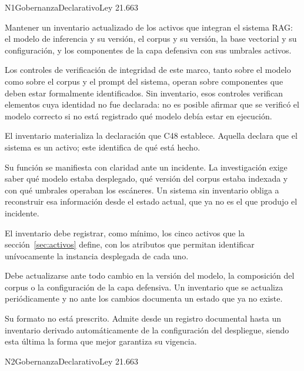   {N1}{Gobernanza}{Declarativo}{Ley 21.663}

Mantener un inventario actualizado de los activos que integran el sistema RAG: el modelo de inferencia y su versión, el corpus y su versión, la base vectorial y su configuración, y los componentes de la capa defensiva con sus umbrales activos.

Los controles de verificación de integridad de este marco, tanto sobre el modelo como sobre el corpus y el prompt del sistema, operan sobre componentes que deben estar formalmente identificados. Sin inventario, esos controles verifican elementos cuya identidad no fue declarada: no es posible afirmar que se verificó el modelo correcto si no está registrado qué modelo debía estar en ejecución.

El inventario materializa la declaración que C48 establece. Aquella declara que el sistema es un activo; este identifica de qué está hecho.

Su función se manifiesta con claridad ante un incidente. La investigación exige saber qué modelo estaba desplegado, qué versión del corpus estaba indexada y con qué umbrales operaban los escáneres. Un sistema sin inventario obliga a reconstruir esa información desde el estado actual, que ya no es el que produjo el incidente.

El inventario debe registrar, como mínimo, los cinco activos que la sección~\ref{sec:activos} define, con los atributos que permitan identificar unívocamente la instancia desplegada de cada uno.

Debe actualizarse ante todo cambio en la versión del modelo, la composición del corpus o la configuración de la capa defensiva. Un inventario que se actualiza periódicamente y no ante los cambios documenta un estado que ya no existe.

Su formato no está prescrito. Admite desde un registro documental hasta un inventario derivado automáticamente de la configuración del despliegue, siendo esta última la forma que mejor garantiza su vigencia.


  {N2}{Gobernanza}{Declarativo}{Ley 21.663}

